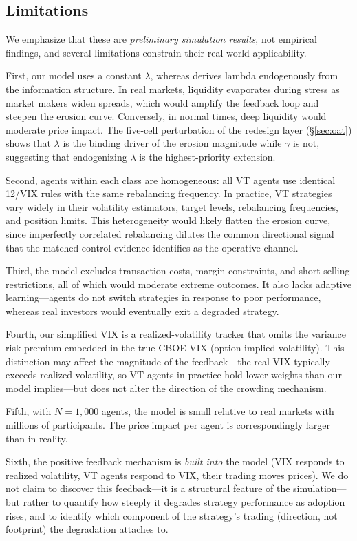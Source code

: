 \documentclass[12pt,a4paper]{article}
\begin{document}
\subsection{Limitations}

We emphasize that these are \emph{preliminary simulation results}, not empirical findings, and several limitations constrain their real-world applicability.

First, our model uses a constant $\lambda$, whereas \citet{kyle1985} derives lambda endogenously from the information structure. In real markets, liquidity evaporates during stress as market makers widen spreads, which would amplify the feedback loop and steepen the erosion curve. Conversely, in normal times, deep liquidity would moderate price impact. The five-cell perturbation of the redesign layer (\S\ref{sec:oat}) shows that $\lambda$ is the binding driver of the erosion magnitude while $\gamma$ is not, suggesting that endogenizing $\lambda$ is the highest-priority extension.

Second, agents within each class are homogeneous: all VT agents use identical 12/VIX rules with the same rebalancing frequency. In practice, VT strategies vary widely in their volatility estimators, target levels, rebalancing frequencies, and position limits. This heterogeneity would likely flatten the erosion curve, since imperfectly correlated rebalancing dilutes the common directional signal that the matched-control evidence identifies as the operative channel.

Third, the model excludes transaction costs, margin constraints, and short-selling restrictions, all of which would moderate extreme outcomes. It also lacks adaptive learning---agents do not switch strategies in response to poor performance, whereas real investors would eventually exit a degraded strategy.

Fourth, our simplified VIX is a realized-volatility tracker that omits the variance risk premium embedded in the true CBOE VIX (option-implied volatility). This distinction may affect the magnitude of the feedback---the real VIX typically exceeds realized volatility, so VT agents in practice hold lower weights than our model implies---but does not alter the direction of the crowding mechanism.

Fifth, with $N = 1{,}000$ agents, the model is small relative to real markets with millions of participants. The price impact per agent is correspondingly larger than in reality.

Sixth, the positive feedback mechanism is \emph{built into} the model (VIX responds to realized volatility, VT agents respond to VIX, their trading moves prices). We do not claim to discover this feedback---it is a structural feature of the simulation---but rather to quantify how steeply it degrades strategy performance as adoption rises, and to identify which component of the strategy's trading (direction, not footprint) the degradation attaches to.
\end{document}
